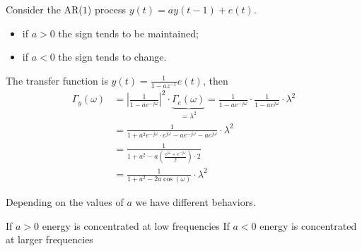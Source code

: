 \begin{figure}[htpb]
	\centering
\end{figure}
\FloatBarrier

\begin{example}
Consider the AR($1$) process $y(t)=ay(t-1)+e(t)$.
\begin{itemize}
	\item if $a>0$ the sign tends to be maintained;
	\item if $a<0$ the sign tends to change.
\end{itemize}
The transfer function is $y(t)=\frac{1}{1-az^{-1} }e(t)$, then
\begin{align*}
	\Gamma _{y}(\omega )&=\left|\frac{1}{1-ae^{-j\omega } }\right|^2 \cdot\underbrace{\Gamma _{e}(\omega )}_{=\lambda^2 } = \frac{1}{1-ae^{-j\omega}}\cdot\frac{1}{1-ae^{j\omega}} \cdot\lambda^2\\
	&=\frac{1}{1+a^2 e^{-j\omega }\cdot e^{j\omega }-ae^{-j\omega}-ae^{j\omega}} \cdot \lambda^2\\
	&=\frac{1}{1+a^2 -a\left( \frac{e^{j\omega}+e^{-j\omega}}{2} \right)\cdot 2}\\
	&=\frac{1}{1+a^2-2a\cos (\omega)} \cdot\lambda^2
\end{align*}
\end{example}
Depending on the values of $a$ we have different behaviors.

If $a>0$ energy is concentrated at low frequencies
If $a<0$ energy is concentrated at larger frequencies

